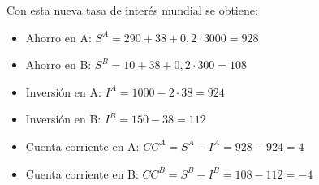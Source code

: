 \documentclass[a4paper]{article}
\begin{document}
\begin{itemize}
\begin{solution}
Con esta nueva tasa de interés mundial se obtiene:

\begin{itemize}
    \item Ahorro en A: \( S^A = 290 + 38 + 0{,}2 \cdot 3000 = 928 \)
    \item Ahorro en B: \( S^B = 10 + 38 + 0{,}2 \cdot 300 = 108 \)
    \item Inversión en A: \( I^A = 1000 - 2 \cdot 38 = 924 \)
    \item Inversión en B: \( I^B = 150 - 38 = 112 \)
    \item Cuenta corriente en A: \( CC^A = S^A - I^A = 928 - 924 = 4 \)
    \item Cuenta corriente en B: \( CC^B = S^B - I^B = 108 - 112 = -4 \)
\end{itemize}
\end{solution}
\end{itemize}
\end{document}
